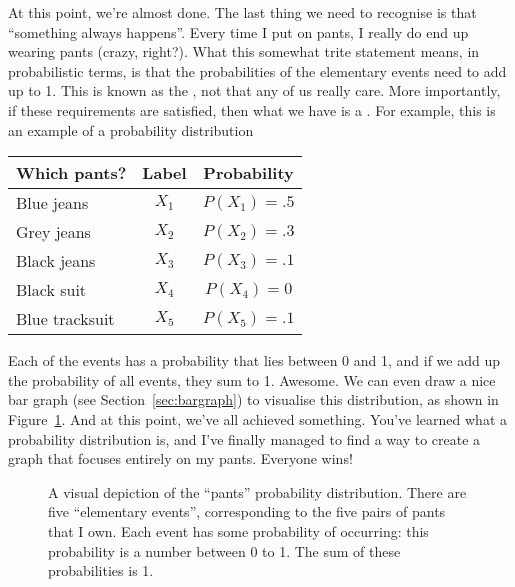 At this point, we're almost done. The last thing we need to recognise is that ``something always happens''. Every time I put on pants, I really do end up wearing pants (crazy, right?). What this somewhat trite statement means, in probabilistic terms, is that the probabilities of the elementary events need to add up to 1. This is known as the , not that any of us really care. More importantly, if these requirements are satisfied, then what we have is a . For example, this is an example of a probability distribution
\begin{center}
\begin{tabular}{lcc} 
Which pants?     &  Label & Probability \\ \hline
Blue jeans &  $X_1$ & $P(X_1) = .5 $ \\
Grey jeans  &  $X_2$ & $P(X_2) = .3 $ \\
Black jeans      &  $X_3$ & $P(X_3) = .1 $ \\
Black suit       &  $X_4$ & $P(X_4) = 0  $ \\
Blue tracksuit  &  $X_5$ & $P(X_5) = .1 $ \\
\end{tabular}
\end{center}
Each of the events has a probability that lies between 0 and 1, and if we add up the probability of all events, they sum to 1. Awesome. We can even draw a nice bar graph (see Section~\ref{sec:bargraph}) to visualise this distribution, as shown in Figure~\ref{fig:pantsprob}. And at this point, we've all achieved something. You've learned what a probability distribution is, and I've finally managed to find a way to create a graph that focuses entirely on my pants. Everyone wins!

\begin{figure}
\begin{center}
\caption{A visual depiction of the ``pants'' probability distribution. There are five ``elementary events'', corresponding to the five pairs of pants that I own. Each event has some probability of occurring: this probability is a number between 0 to 1. The sum of these probabilities is 1.}
\label{fig:pantsprob}
\HR
\end{center}
\end{figure}



